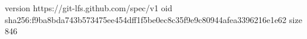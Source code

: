 version https://git-lfs.github.com/spec/v1
oid sha256:f9ba8bda743b573475ee454dff1f5be0ec8c35f9e9c80944afea3396216e1e62
size 846

